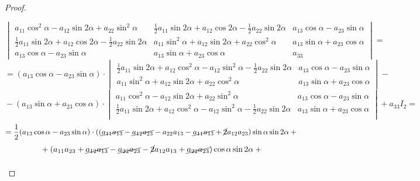 \begin{proof}
\begin{itemize}
\begin{equation*}
	\begin{vmatrix}
	a_{11} \cos^2 \alpha - a_{12} \sin 2\alpha + a_{22} \sin^2 \alpha & \frac12 a_{11} \sin 2\alpha + a_{12} \cos 2\alpha - \frac12 a_{22} \sin 2\alpha & a_{13} \cos \alpha - a_{23} \sin \alpha \\
	\frac12 a_{11} \sin 2\alpha + a_{12} \cos 2\alpha - \frac12 a_{22} \sin 2\alpha & a_{11} \sin^2 \alpha + a_{12} \sin 2\alpha + a_{22} \cos^2 \alpha & a_{13} \sin \alpha + a_{23} \cos \alpha \\
	a_{13} \cos \alpha - a_{23} \sin \alpha & a_{13} \sin \alpha + a_{23} \cos \alpha & a_{33}
	\end{vmatrix} =
	\end{equation*}
	\begin{equation*}
	= (a_{13} \cos \alpha - a_{23} \sin \alpha) \cdot
	\begin{vmatrix}
	\frac12 a_{11} \sin 2\alpha + a_{12} \cos^2 \alpha - a_{12} \sin^2 \alpha - \frac12 a_{22} \sin 2\alpha & a_{13} \cos \alpha - a_{23} \sin \alpha \\
	a_{11} \sin^2 \alpha + a_{12} \sin 2\alpha + a_{22} \cos^2 \alpha & a_{13} \sin \alpha + a_{23} \cos \alpha
	\end{vmatrix} - {}
	\end{equation*}
	\begin{equation*}
	{} - (a_{13} \sin \alpha + a_{23} \cos \alpha) \cdot
	\begin{vmatrix}
	a_{11} \cos^2 \alpha - a_{12} \sin 2\alpha + a_{22} \sin^2 \alpha & a_{13} \cos \alpha - a_{23} \sin \alpha \\
	\frac12 a_{11} \sin 2\alpha + a_{12} \cos^2 \alpha - a_{12} \sin^2 \alpha - \frac12 a_{22} \sin 2\alpha & a_{13} \sin \alpha + a_{23} \cos \alpha \\
	\end{vmatrix}
	+ a_{33} I_2 =
	\end{equation*}
	\begin{equation*}
	= \frac12 (a_{13} \cos \alpha - a_{23} \sin \alpha) \cdot
	((\cancel{a_{11} a_{13}} - \cancel{a_{12} a_{23}} - a_{22} a_{13} - \cancel{a_{11} a_{13}} + \cancel2 a_{12} a_{23}) \sin \alpha \sin 2\alpha + {}
	\end{equation*}
	\begin{equation*}
	{} + (a_{11} a_{23} + \cancel{a_{12} a_{13}} - \cancel{a_{22} a_{23}} - \cancel2 a_{12} a_{13} + \cancel{a_{22} a_{23}}) \cos \alpha \sin 2\alpha + {}
	\end{equation*}
	\begin{equation*}

\end{equation*}
\end{itemize}
\end{proof}
